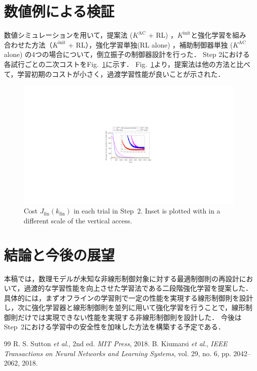 \documentclass[twocolumn]{jarticle}
\newcommand{\rfig}[1]{Fig.~\ref{#1}}
\begin{document}
\section{数値例による検証}
数値シミュレーションを用いて，提案法 ($K^{\mathrm{AC}}$ + RL) ，$K^{\mathrm{init}}$と強化学習を組み合わせた方法（$K^{\mathrm{init}}$ + RL），強化学習単独(RL alone) ，補助制御器単独 ($K^{\mathrm{AC}}$ alone) の4つの場合について，倒立振子の制御器設計を行った．
Step 2における各試行ごとの二次コストを\rfig{fig:simulation}に示す．
\rfig{fig:simulation}より，提案法は他の方法と比べて，学習初期のコストが小さく，過渡学習性能が良いことが示された．
\begin{figure}[tb]
    \centering
    \includegraphics[width=\columnwidth]{figures/step2_cost_fig.pdf}
    \caption{Cost $J_\mathrm{fin}(k_{\mathrm{fin}})$ in each trial in Step~2. Inset is plotted with in a different scale of the vertical access. %
    }
    \label{fig:simulation}
\end{figure}


\section{結論と今後の展望}
本稿では，数理モデルが未知な非線形制御対象に対する最適制御則の再設計において，過渡的な学習性能を向上させた学習法である二段階強化学習を提案した．具体的には，まずオフラインの学習則で一定の性能を実現する線形制御則を設計し，次に強化学習器と線形制御則を並列に用いて強化学習を行うことで，線形制御則だけでは実現できない性能を実現する非線形制御則を設計した．
今後はStep~2における学習中の安全性を加味した方法を構築する予定である．


\begin{thebibliography} {99}
     R. S. Sutton {\it et al}., %
    2nd ed. { \it MIT Press}, 2018.
     B. Kiumarsi {\it et al}., 
    {\it IEEE Transactions on Neural Networks and Learning Systems}, vol. 29, no. 6, pp. 2042–2062, 2018.
\end{thebibliography}
\end{document}
